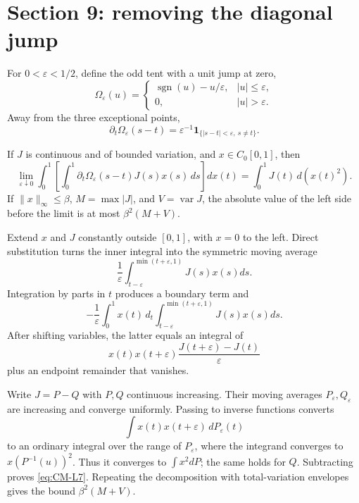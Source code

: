 \section{Section 9: removing the diagonal jump}

For \(0<\varepsilon<1/2\), define the odd tent with a unit jump at zero,
\[
 \Omega_\varepsilon(u)=
 \begin{cases}
 \operatorname{sgn}(u)-u/\varepsilon,&|u|\le\varepsilon,\\
 0,&|u|>\varepsilon.
 \end{cases}
\]
Away from the three exceptional points,
\[
 \partial_t\Omega_\varepsilon(s-t)
 =\varepsilon^{-1}\mathbf1_{\{|s-t|<\varepsilon,\ s\ne t\}}.
\]

\begin{lemma}[Lemma 7]
If \(J\) is continuous and of bounded variation, and \(x\in C_0[0,1]\), then
\begin{equation}
 \lim_{\varepsilon\downarrow0}
 \int_0^1\left[\int_0^1\partial_t\Omega_\varepsilon(s-t)J(s)x(s)\,ds\right]dx(t)
 =\int_0^1J(t)\,d(x(t)^2).
 \tag{9.2}\label{eq:CM-L7}
\end{equation}
If \(\|x\|_\infty\le\beta\), \(M=\max|J|\), and \(V=\operatorname{var}J\), the absolute value of the left side before the limit is at most \(\beta^2(M+V)\).
\end{lemma}

Extend \(x\) and \(J\) constantly outside \([0,1]\), with \(x=0\) to the left.  Direct substitution turns the inner integral into the symmetric moving average
\[
 \frac1\varepsilon\int_{t-\varepsilon}^{\min(t+\varepsilon,1)}J(s)x(s)ds.
\]
Integration by parts in \(t\) produces a boundary term and
\[
 -\frac1\varepsilon\int_0^1x(t)\,d_t
 \int_{t-\varepsilon}^{\min(t+\varepsilon,1)}J(s)x(s)ds.
\]
After shifting variables, the latter equals an integral of
\[
 x(t)x(t+\varepsilon)\frac{J(t+\varepsilon)-J(t)}{\varepsilon}
\]
plus an endpoint remainder that vanishes.

Write \(J=P-Q\) with \(P,Q\) continuous increasing.  Their moving averages \(P_\varepsilon,Q_\varepsilon\) are increasing and converge uniformly.  Passing to inverse functions converts
\[
 \int x(t)x(t+\varepsilon)\,dP_\varepsilon(t)
\]
to an ordinary integral over the range of \(P_\varepsilon\), where the integrand converges to \(x(P^{-1}(u))^2\).  Thus it converges to \(\int x^2dP\); the same holds for \(Q\).  Subtracting proves \eqref{eq:CM-L7}.  Repeating the decomposition with total-variation envelopes gives the bound \(\beta^2(M+V)\).

